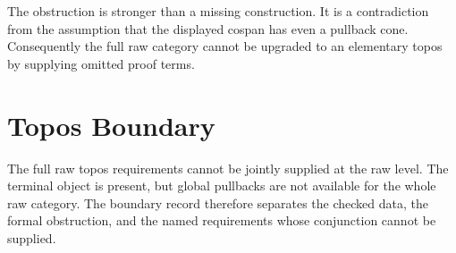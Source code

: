 \documentclass[11pt]{article}
\begin{document}
The obstruction is stronger than a missing construction.  It is a
contradiction from the assumption that the displayed cospan has even a
pullback cone.  Consequently the full raw category cannot be upgraded to
an elementary topos by supplying omitted proof terms.

\section{Topos Boundary}

The full raw topos requirements cannot be jointly supplied at the raw
level.  The terminal object is present, but global pullbacks are not
available for the whole raw category.  The boundary record therefore
separates the checked data, the formal obstruction, and the named
requirements whose conjunction cannot be supplied.
\end{document}
